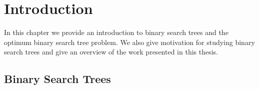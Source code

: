 \documentclass[letterpaper,12pt,titlepage,oneside,final]{book}
\theoremstyle{plain}
\begin{document}
 


\chapter{Introduction}

In this chapter we provide an introduction to binary search trees and the optimum binary search tree problem. We also give motivation for studying binary search trees and give an overview of the work presented in this thesis.

\section{Binary Search Trees}
\end{document}
